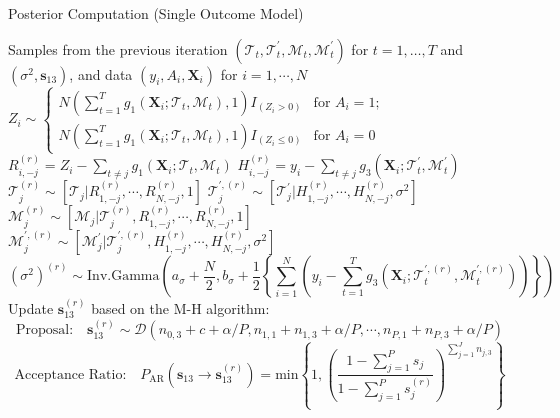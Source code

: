  \begin{algorithm}
\caption{Posterior Computation (Single Outcome Model)}\label{alg:single}
\begin{algorithmic}[1]
\Require Samples from the previous iteration $(\mathcal{T}_t, \mathcal{T}^\prime_t,\mathcal{M}_t,\mathcal{M}_t^\prime)$ for $t=1, \ldots, T$ and $(\sigma^2, \boldsymbol{s}_{13})$, and data $(y_i, A_i, \boldsymbol{X}_i)$ for $i=1, \cdots, N$
\State $Z_i \sim \left\{ \begin{array}{ll}
         N\left(\sum_{t=1}^T g_1(\boldsymbol{X}_i; \mathcal{T}_t, \mathcal{M}_t), 1\right)I_{(Z_i  > 0)} & \mbox{for $A_i =1 $};\\
        N\left(\sum_{t=1}^T g_1(\boldsymbol{X}_i; \mathcal{T}_t, \mathcal{M}_t), 1\right)I_{(Z_i  \leq 0)} & \mbox{for $A_i = 0 $}\end{array} \right.$ 
\EndFor
{}
\State $R_{i,-j}^{(r)} = Z_i - \sum_{t\neq j} g_1(\boldsymbol{X}_i; \mathcal{T}_t, \mathcal{M}_t)$  
\State $H_{i,-j}^{(r)} = y_i - \sum_{t\neq j} g_3(\boldsymbol{X}_i; \mathcal{T}_t^\prime, \mathcal{M}_t^\prime)$  
\EndFor
\State $\mathcal{T}_j^{(r)} \sim [\mathcal{T}_j | R_{1, -j}^{(r)}, \cdots, R_{N, -j}^{(r)}, 1]$  
\State $\mathcal{T}_j^{\prime,(r)} \sim [\mathcal{T}_j^\prime | H_{1, -j}^{(r)}, \cdots, H_{N, -j}^{(r)}, \sigma^2]$  
\State $\mathcal{M}_j^{(r)} \sim [\mathcal{M}_j | \mathcal{T}_j^{(r)}, R_{1, -j}^{(r)}, \cdots, R_{N, -j}^{(r)}, 1]$
\State $\mathcal{M}_j^{\prime,(r)} \sim [\mathcal{M}_j^\prime | \mathcal{T}_j^{\prime,(r)}, H_{1, -j}^{(r)}, \cdots, H_{N, -j}^{(r)}, \sigma^2]$
\EndFor
\State \[(\sigma^2)^{(r)} \sim \text{Inv.Gamma}\left(a_\sigma+\frac{N}{2}, b_\sigma+\frac{1}{2}\left\{\sum_{i=1}^{N} \left(y_i - \sum_{t=1}^T g_3(\boldsymbol{X}_i; \mathcal{T}_t^{\prime,(r)}, \mathcal{M}_t^{\prime,(r)})\right) \right\}\right)\]
\State Update $\boldsymbol{s}_{13}^{(r)}$ based on the M-H algorithm:
\State \[\text{Proposal:} \quad \boldsymbol{s}_{13}^{(r)} \sim \mathcal{D}\left(n_{0,3} + c + \alpha/P, n_{1,1}+n_{1,3} + \alpha/P, \cdots, n_{P,1}+n_{P,3} + \alpha/P\right)\]
\State \[\text{Acceptance Ratio:} \quad P_\text{AR} (\boldsymbol{s}_{13} \rightarrow \boldsymbol{s}_{13}^{(r)}) = \text{min} \left\{1, \left(\frac{1-\sum_{j=1}^P s_j}{1-\sum_{j=1}^Ps_j^{(r)}}\right)^{\sum_{j=1}^J n_{j,3}}  \right\}\]
\EndFor
\end{algorithmic}
\end{algorithm}




